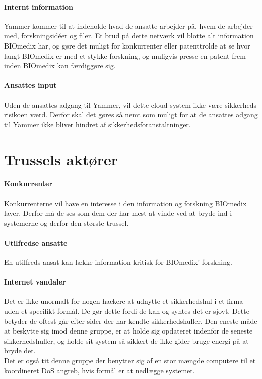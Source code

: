 \documentclass{article}
\begin{document}
\paragraph{Internt information}
Yammer kommer til at indeholde hvad de ansatte arbejder på, hvem de arbejder med, forskningsidéer og filer. Et brud på dette netværk vil blotte alt information BIOmedix har, og gøre det muligt for konkurrenter eller patenttrolde at se hvor langt BIOmedix er med et stykke forskning, og muligvis presse en patent frem inden BIOmedix kan færdiggøre sig. 

\paragraph{Ansattes input}
Uden de ansattes adgang til Yammer, vil dette cloud system ikke være sikkerheds risikoen værd. 
Derfor skal det gøres så nemt som muligt for at de ansattes adgang til Yammer ikke bliver 
hindret af sikkerhedsforanstaltninger.  


\section{Trussels aktører}

\paragraph{Konkurrenter}
Konkurrenterne vil have en interesse i den information og forskning BIOmedix laver.
Derfor må de ses som dem der har mest at vinde ved at bryde ind i systemerne og derfor
den største trussel.

\paragraph{Utilfredse ansatte}
En utilfreds ansat kan lække information kritisk for BIOmedix' forskning.




\paragraph{Internet vandaler}
Det er ikke unormalt for nogen hackere at udnytte et sikkerhedshul i et firma
uden et specifikt formål. De gør dette fordi de kan og syntes det er sjovt. Dette
betyder de oftest går efter sider der har kendte sikkerhedshuller.
Den eneste måde at beskytte sig imod denne gruppe, er at holde sig opdateret indenfor de
seneste sikkerhedshuller, og holde sit system så sikkert de ikke gider bruge
energi på at bryde det.\\
Det er også tit denne gruppe der benytter sig af en stor mængde computere
til et koordineret DoS angreb, hvis formål er at nedlægge systemet.
\end{document}
